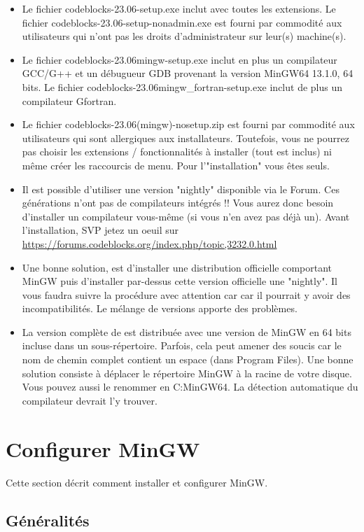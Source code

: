 \begin{itemize}
\item Le fichier codeblocks-23.06-setup.exe inclut \codeblocks avec toutes les extensions. Le fichier codeblocks-23.06-setup-nonadmin.exe est fourni par commodité aux utilisateurs qui n'ont pas les droits d'administrateur sur leur(s) machine(s).
\item Le fichier codeblocks-23.06mingw-setup.exe inclut en plus un compilateur GCC/G++ et un débugueur GDB provenant la version MinGW64 13.1.0, 64 bits. Le fichier codeblocks-23.06mingw\_fortran-setup.exe inclut de plus un compilateur Gfortran.
\item Le fichier codeblocks-23.06(mingw)-nosetup.zip est fourni par commodité aux utilisateurs qui sont allergiques aux installateurs. Toutefois, vous ne pourrez pas choisir les extensions / fonctionnalités à installer (tout est inclus) ni même créer les raccourcis de menu. Pour l'"installation" vous êtes seuls.
\item Il est possible d'utiliser une version "nightly" disponible via le Forum. Ces générations n'ont pas de compilateurs intégrés !! Vous aurez donc besoin d'installer un compilateur vous-même (si vous n'en avez pas déjà un). Avant l'installation, SVP jetez un oeuil sur \url{https://forums.codeblocks.org/index.php/topic,3232.0.html} 
\item Une bonne solution, est d'installer une distribution officielle comportant MinGW puis d'installer par-dessus cette version officielle une "nightly". Il vous faudra suivre la procédure avec attention car car il pourrait y avoir des incompatibilités. Le mélange de versions apporte des problèmes. 
\item La version complète de \codeblocks est distribuée avec une version de MinGW en 64 bits incluse dans un sous-répertoire. Parfois, cela peut amener des soucis car le nom de chemin complet contient un espace (dans Program Files). Une bonne solution consiste à déplacer le répertoire MinGW à la racine de votre disque. Vous pouvez aussi le renommer en C:\osp MinGW64. La détection automatique du compilateur devrait l'y trouver.
\end{itemize}

\section{Configurer MinGW}

Cette section décrit comment installer et configurer MinGW.

\subsection{Généralités}

